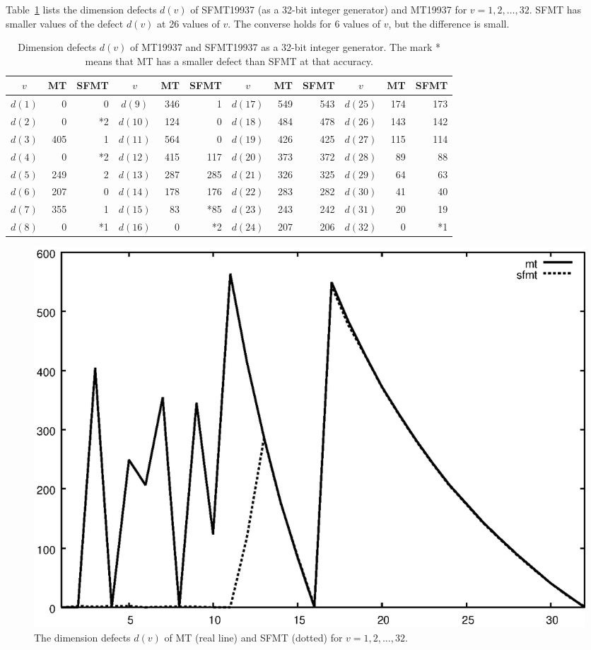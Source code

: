 \documentclass[acmnow]{acmtrans2m}
\begin{document}
Table~\ref{tab:dd} lists the dimension defects $d(v)$
of SFMT19937 (as a 32-bit integer generator) 
and MT19937 for $v=1,2,\ldots, 32$.
SFMT has smaller values of the defect $d(v)$
at 26 values of $v$. The converse holds for 6 values of
$v$, but the difference is small.
\begin{table}
\begin{tabular}{|c|rr||c|rr||c|rr||c|rr|} \hline
$v$ & MT & SFMT & $v$ & MT & SFMT & $v$ & MT & SFMT & $v$ & MT & SFMT\\ \hline
$d(1)$ & 0 & 0 & $d(9)$ & 346 & 1 & $d(17)$ & 549 & 543 & $d(25)$ & 174 & 173 \\
$d(2)$ & 0 & *2 & $d(10)$ & 124 & 0 & $d(18)$ & 484 & 478 & $d(26)$ & 143 & 142
\\
$d(3)$ & 405 & 1 & $d(11)$ & 564 & 0 & $d(19)$ & 426 & 425 & $d(27)$ & 115 & 114
\\
$d(4)$ & 0 & *2 & $d(12)$ & 415 & 117 & $d(20)$ & 373 & 372 & $d(28)$ & 89 & 88
\\
$d(5)$ & 249 & 2 & $d(13)$ & 287 & 285 & $d(21)$ & 326 & 325 & $d(29)$ & 64 & 63
\\
$d(6)$ & 207 & 0 & $d(14)$ & 178 & 176 & $d(22)$ & 283 & 282 & $d(30)$ & 41 & 40
\\
$d(7)$ & 355 & 1 & $d(15)$ & 83 & *85 & $d(23)$ & 243 & 242 & $d(31)$ & 20 & 19 
\\
$d(8)$ & 0 & *1 & $d(16)$ & 0 & *2 & $d(24)$ & 207 & 206 & $d(32)$ & 0 & *1 \\
\hline

\end{tabular}
\caption{Dimension defects 
$d(v)$ of MT19937 and SFMT19937
as a 32-bit integer generator.
The mark * means that MT has a smaller defect than SFMT
at that accuracy.
}\label{tab:dd}
\end{table}

\begin{figure}
\begin{center}
\includegraphics[width=0.8\linewidth,height=0.7\textheight,
keepaspectratio]{delta.eps}
\end{center}
\caption{The dimension defects $d(v)$ of MT (real line) and SFMT (dotted)
for $v=1,2,\ldots, 32$.}
\end{figure}
\end{document}
